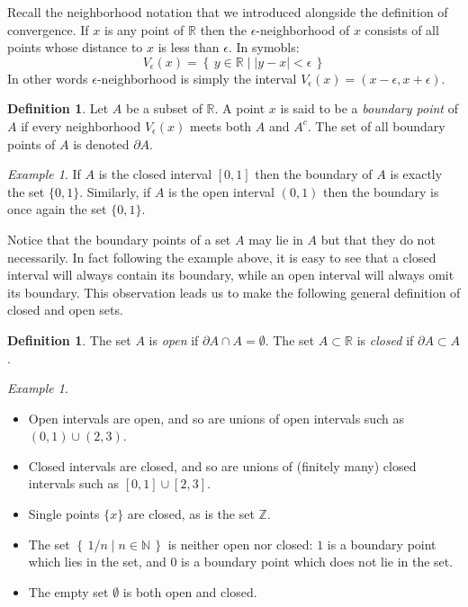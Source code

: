 \documentclass[11pt,oneside]{amsbook}
\newcommand{\set}[1]{\left\{\,#1\,\right\}}
\newcommand{\NN}{\mathbb N}
\newcommand{\ZZ}{\mathbb Z}
\newcommand{\RR}{\mathbb R}
\theoremstyle{definition}
\theoremstyle{plain}
\theoremstyle{definition}
\newtheorem{defn}[thm]{Definition}
\theoremstyle{remark}
\newtheorem{example}[thm]{Example}
\numberwithin{equation}{section}
\numberwithin{figure}{section}
\begin{document}
Recall the neighborhood notation that we introduced alongside the definition of convergence. If $x$ is any point of $\RR$ then the $\epsilon$-neighborhood of $x$ consists of all points whose distance to $x$ is less than $\epsilon$. In symobls:
\[V_\epsilon(x)=\set{y\in\RR\mid|y-x|<\epsilon}
\]
In other words $\epsilon$-neighborhood is simply the interval $V_\epsilon(x)=(x-\epsilon,x+\epsilon)$.


\begin{defn}
  Let $A$ be a subset of $\RR$. A point $x$ is said to be a \emph{boundary point} of $A$ if every neighborhood $V_\epsilon(x)$ meets both $A$ and $A^c$. The set of all boundary points of $A$ is denoted $\partial A$.
\end{defn}

\begin{example}
  If $A$ is the closed interval $[0,1]$ then the boundary of $A$ is exactly the set $\{0,1\}$. Similarly, if $A$ is the open interval $(0,1)$ then the boundary is once again the set $\{0,1\}$.
\end{example}

Notice that the boundary points of a set $A$ may lie in $A$ but that they do not necessarily. In fact following the example above, it is easy to see that a closed interval will always contain its boundary, while an open interval will always omit its boundary. This observation leads us to make the following general definition of closed and open sets.

\begin{defn}
  The set $A$ is \emph{open} if $\partial A\cap A=\emptyset$. The set $A\subset\RR$ is \emph{closed} if $\partial A\subset A$.
\end{defn}

\begin{example}
  \begin{itemize}
  \item Open intervals are open, and so are unions of open intervals such as $(0,1)\cup(2,3)$.
  \item Closed intervals are closed, and so are unions of (finitely many) closed intervals such as $[0,1]\cup[2,3]$.
  \item Single points $\{x\}$ are closed, as is the set $\ZZ$.
  \item The set $\set{1/n\mid n\in\NN}$ is neither open nor closed: $1$ is a boundary point which lies in the set, and $0$ is a boundary point which does not lie in the set.
  \item The empty set $\emptyset$ is both open and closed.
  \end{itemize}
\end{example}
\end{document}
